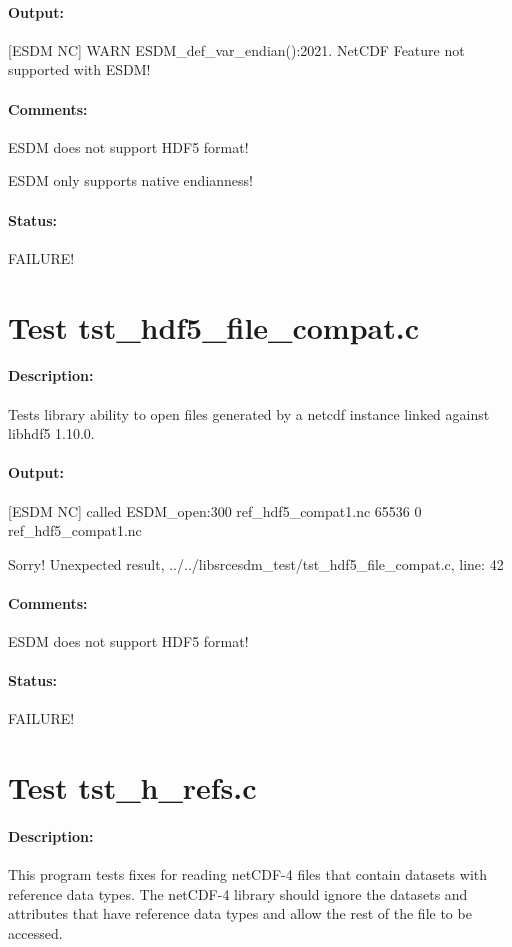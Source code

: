 \paragraph{Output:} [ESDM NC] WARN ESDM\_def\_var\_endian():2021. NetCDF Feature not supported with ESDM!

\paragraph{Comments:} ESDM does not support HDF5 format!

ESDM only supports native endianness!

\paragraph{Status:} FAILURE!

\section{Test tst\_hdf5\_file\_compat.c}

\paragraph{Description:} Tests library ability to open files generated by a netcdf instance linked against libhdf5 1.10.0.

\paragraph{Output:} [ESDM NC] called ESDM\_open:300 ref\_hdf5\_compat1.nc 65536 0 ref\_hdf5\_compat1.nc

Sorry! Unexpected result, ../../libsrcesdm\_test/tst\_hdf5\_file\_compat.c, line: 42

\paragraph{Comments:} ESDM does not support HDF5 format!

\paragraph{Status:} FAILURE!

\section{Test tst\_h\_refs.c}

\paragraph{Description:} This program tests fixes for reading netCDF-4 files that contain datasets with reference data types.  The netCDF-4 library should ignore the datasets and attributes that have reference data types and allow the rest of the file to be accessed.

